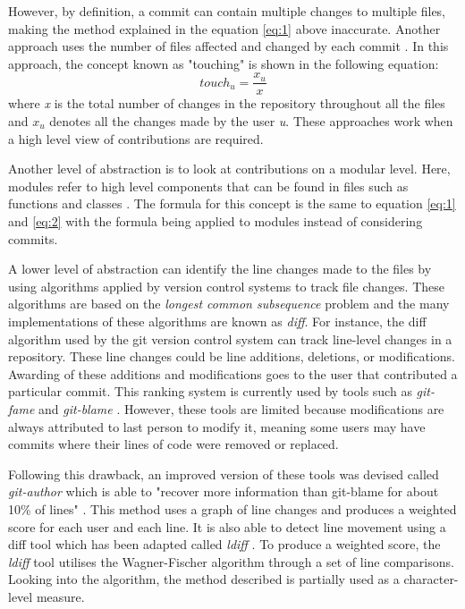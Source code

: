 However, by definition, a commit can contain multiple changes to multiple files, making the method explained in the equation \ref{eq:1} above inaccurate. Another approach uses the number of files affected and changed by each commit \citep{10.1145/2025113.2025119}. In this approach, the concept known as "touching" is shown in the following equation:
\begin{equation} \label{eq:2}
    touch_u = \frac{x_u}{x}
\end{equation}
where \textit{x} is the total number of changes in the repository throughout all the files and \textit{$x_u$} denotes all the changes made by the user \textit{u}. These approaches work when a high level view of contributions are required. 

Another level of abstraction is to look at contributions on a modular level. Here, modules refer to high level components that can be found in files such as functions and classes \cite{10.1145/2601248.2601283}. The formula for this concept is the same to equation \ref{eq:1} and \ref{eq:2} with the formula being applied to modules instead of considering commits.

A lower level of abstraction can identify the line changes made to the files by using algorithms applied by version control systems to track file changes. These algorithms are based on the \textit{longest common subsequence} problem \citep{10.1145/322063.322075} and the many implementations of these algorithms are known as \textit{diff}. For instance, the diff algorithm used by the git version control system can track line-level changes in a repository. These line changes could be line additions, deletions, or modifications. Awarding of these additions and modifications goes to the user that contributed a particular commit. This ranking system is currently used by tools such as \textit{git-fame} \citep{oleander_2020} and \textit{git-blame} \citep{git-blame_2020}. However, these tools are limited because modifications are always attributed to last person to modify it, meaning some users may have commits where their lines of code were removed or replaced. 

Following this drawback, an improved version of these tools was devised called \textit{git-author} which is able to "recover more information than git-blame for about 10\% of lines" \citep{git-author_2013}. This method uses a graph of line changes and produces a weighted score for each user and each line. It is also able to detect line movement using a diff tool which has been adapted called \textit{ldiff} \citep{5070564}. To produce a weighted score, the \textit{ldiff} tool utilises the Wagner-Fischer algorithm \citep{10.1145/321796.321811} through a set of line comparisons. Looking into the algorithm, the method described is partially used as a character-level measure.

